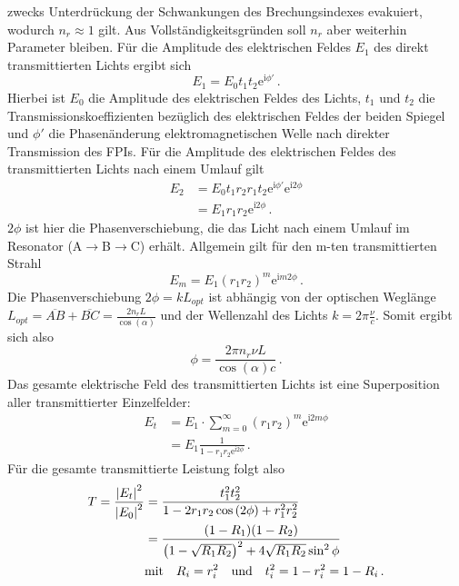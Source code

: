 zwecks Unterdrückung der Schwankungen des Brechungsindexes evakuiert, wodurch
$n_r\approx1$ gilt. Aus Vollständigkeitsgründen soll $n_r$ aber weiterhin
Parameter bleiben. Für die Amplitude des elektrischen Feldes $E_1$ des direkt
transmittierten Lichts ergibt sich
\begin{equation}\label{eq:FPI_E1}
	E_1=E_0t_1t_2\mathrm{e}^{\mathrm{i}\phi'}\,.
\end{equation}
Hierbei ist $E_0$ die Amplitude des elektrischen Feldes des Lichts, $t_1$ und
$t_2$ die Transmissionskoeffizienten bezüglich des elektrischen Feldes der
beiden Spiegel und $\phi'$ die Phasenänderung elektromagnetischen Welle nach
direkter Transmission des FPIs. Für die Amplitude des elektrischen Feldes des
transmittierten Lichts nach einem Umlauf gilt
\begin{equation}\label{eq:FPI_E2}
	\begin{split}
		E_2
		&=E_0t_1r_2r_1t_2\mathrm{e}^{\mathrm{i}\phi'}\mathrm{e}^{\mathrm{i}2\phi}\\
		&=E_1r_1r_2\mathrm{e}^{\mathrm{i}2\phi}\,.
	\end{split}
\end{equation}
$2\phi$ ist hier die Phasenverschiebung, die das Licht nach einem Umlauf im
Resonator (A$\rightarrow$B$\rightarrow$C) erhält. Allgemein gilt für den m-ten
transmittierten Strahl
\begin{equation}\label{eq:FPI_Em}
	E_m=E_1(r_1r_2)^m\mathrm{e}^{\mathrm{i}m2\phi}\,.
\end{equation}
Die Phasenverschiebung $2\phi=kL_{opt}$ ist abhängig von der optischen Weglänge
$L_{opt}=\overline{AB}+\overline{BC}=\frac{2n_rL}{\cos{(\alpha)}}$ und der Wellenzahl des
Lichts $k=2\pi\frac{\nu}{c}$. Somit ergibt sich also
\begin{equation}\label{eq:FPI_phase}
	\phi=\frac{2\pi n_r\nu L}{\cos{(\alpha)}c}\,.
\end{equation}
Das gesamte elektrische Feld des transmittierten Lichts ist eine Superposition
aller transmittierter Einzelfelder:
\begin{equation}\label{eq:FPI_Et}
	\begin{split}
		E_t
		&=E_1\cdot\sum\limits_{m=0}^\infty(r_1r_2)^m\mathrm{e}^{\mathrm{i}2m\phi}\\
		&=E_1\frac{1}{1-r_1r_2\mathrm{e}^{\mathrm{i}2\phi}}\,.
	\end{split}
\end{equation}
Für die gesamte transmittierte Leistung folgt also
\begin{equation}\label{eq:FPI_transmission}
	\begin{split}
		T=\frac{\left|E_t\right|^2}{\left|E_0\right|^2}
		&=\frac{t_1^2t_2^2}{1-2r_1r_2\cos{(2\phi)}+r_1^2r_2^2}\\
		&=\frac{(1-R_1)(1-R_2)}{\left(1-\sqrt{R_1R_2}\right)^2+4\sqrt{R_1R_2}\sin^2{\phi}}\\
		&\text{mit}\quad
		R_i=r_i^2
		\quad\text{und}\quad
		t_i^2=1-r_i^2=1-R_i\,.
	\end{split}
\end{equation}
